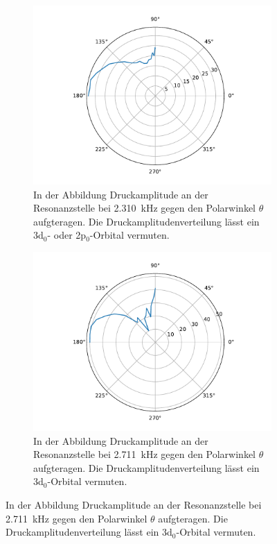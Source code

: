             \begin{figure}[ht]
                \centering
                \begin{subfigure}[b]{0.45\textwidth}
                    \centering
                    \includegraphics[scale=0.3]{./pictures/H_atom_resonanz_1_2310Hz.pdf}
                    \caption{In der Abbildung Druckamplitude an der Resonanzstelle bei \SI{2.310}{\kilo\hertz} gegen den Polarwinkel $\theta$ aufgteragen. Die Druckamplitudenverteilung lässt ein 3d$_0$- oder 2p$_0$-Orbital vermuten.}
                    \label{fig:H_atom_resonanz_1_2310Hz}
                \end{subfigure}
                \hfill
                \centering
                \begin{subfigure}[b]{0.45\textwidth}
                    \centering
                    \includegraphics[scale=0.3]{./pictures/H_atom_resonanz_2_3711Hz.pdf}
                    \caption{In der Abbildung Druckamplitude an der Resonanzstelle bei \SI{2.711}{\kilo\hertz} gegen den Polarwinkel $\theta$ aufgteragen. Die Druckamplitudenverteilung lässt ein 3d$_0$-Orbital vermuten.}
                    \label{fig:H_atom_resonanz_2_3711Hz}
                \end{subfigure}
            \end{figure}
